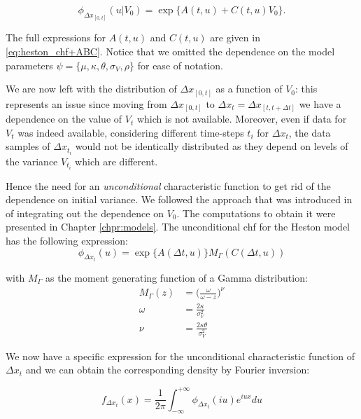 \begin{equation}
\phi_{\Delta x_{[0, t] }}(u|V_0) =  \exp\{A(t,u) + C(t,u) V_0\}.
\end{equation}

The full expressions for $A(t,u)$ and $C(t,u)$ are given in \eqref{eq:heston_chf+ABC}.
Notice that we omitted the dependence on the model parameters $\psi = \{\mu, \kappa, \theta, \sigma_V, \rho \}$ for ease of notation.

\bigskip
We are now left with the distribution of $\Delta x_{[0, t] }$ as a function of $V_0$: this represents an issue since moving from $\Delta x_{[0, t] }$ to $\Delta x_t  = \Delta x_{[t, t + \Delta t]}$ we have a dependence on the value of $V_t$ which is not available. Moreover, even if data for $V_t$ was indeed available, considering different time-steps $t_i$ for $\Delta x_{t}$, the data samples of $\Delta x_{t_i}$ would not be identically distributed as they depend on levels of the variance $V_{t_i}$ which are different.

Hence the need for an \textit{unconditional} characteristic function to get rid of the dependence on initial variance. We followed the approach that was introduced in \citep{DRAGULESCU2002} of integrating out the dependence on $V_0$. The computations to obtain it were presented in Chapter \ref{chpr:models}.
The unconditional chf for the Heston model has the following expression:
\begin{equation}
 \phi_{\Delta x_t}(u) = \exp\{A(\Delta t,u) \} M_{\Gamma}(C(\Delta t,u))
\end{equation}


with $M_{\Gamma}$ as the moment generating function of a Gamma distribution:
\begin{subequations}
\begin{align}
	M_{\Gamma} (z) &= \Big(\frac{\omega}{\omega-z}\Big)^\nu \nonumber \\
	\omega&= \frac{2\kappa}{\sigma_V^2} \nonumber\\
	\nu&= \frac{2\kappa\theta}{\sigma_V^2}\nonumber
\end{align}
\end{subequations}

We now have a specific expression for the unconditional characteristic function of $\Delta x_t$ and we can obtain the corresponding density by Fourier inversion:

\begin{equation}
\label{eq:uncond_inversion}
f_{\Delta x_t}(x) = \frac{1}{2\pi}\int_{-\infty}^{+\infty}  \phi_{\Delta x_t}(i u) e^{i u x} du
\end{equation}


